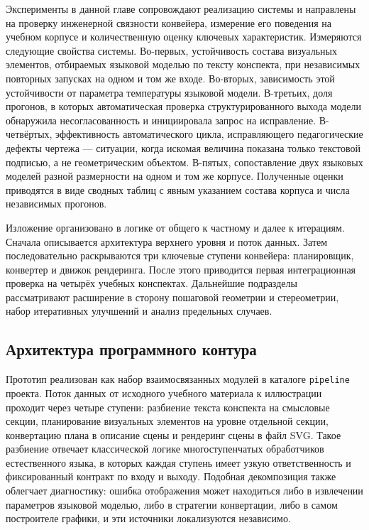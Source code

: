 Эксперименты в данной главе сопровождают реализацию системы и направлены на проверку инженерной связности конвейера, измерение его поведения на учебном корпусе и количественную оценку ключевых характеристик. Измеряются следующие свойства системы. Во-первых, устойчивость состава визуальных элементов, отбираемых языковой моделью по тексту конспекта, при независимых повторных запусках на одном и том же входе. Во-вторых, зависимость этой устойчивости от параметра температуры языковой модели. В-третьих, доля прогонов, в которых автоматическая проверка структурированного выхода модели обнаружила несогласованность и инициировала запрос на исправление. В-четвёртых, эффективность автоматического цикла, исправляющего педагогические дефекты чертежа --- ситуации, когда искомая величина показана только текстовой подписью, а не геометрическим объектом. В-пятых, сопоставление двух языковых моделей разной размерности на одном и том же корпусе. Полученные оценки приводятся в виде сводных таблиц с явным указанием состава корпуса и числа независимых прогонов.

Изложение организовано в логике от общего к частному и далее к итерациям. Сначала описывается архитектура верхнего уровня и поток данных. Затем последовательно раскрываются три ключевые ступени конвейера: планировщик, конвертер и движок рендеринга. После этого приводится первая интеграционная проверка на четырёх учебных конспектах. Дальнейшие подразделы рассматривают расширение в сторону пошаговой геометрии и стереометрии, набор итеративных улучшений и анализ предельных случаев.

\subsection{Архитектура программного контура}
\label{sec:ch3:architecture}

Прототип реализован как набор взаимосвязанных модулей в каталоге \texttt{pipeline} проекта. Поток данных от исходного учебного материала к иллюстрации проходит через четыре ступени: разбиение текста конспекта на смысловые секции, планирование визуальных элементов на уровне отдельной секции, конвертацию плана в описание сцены и рендеринг сцены в файл SVG. Такое разбиение отвечает классической логике многоступенчатых обработчиков естественного языка, в которых каждая ступень имеет узкую ответственность и фиксированный контракт по входу и выходу. Подобная декомпозиция также облегчает диагностику: ошибка отображения может находиться либо в извлечении параметров языковой моделью, либо в стратегии конвертации, либо в самом построителе графики, и эти источники локализуются независимо.

